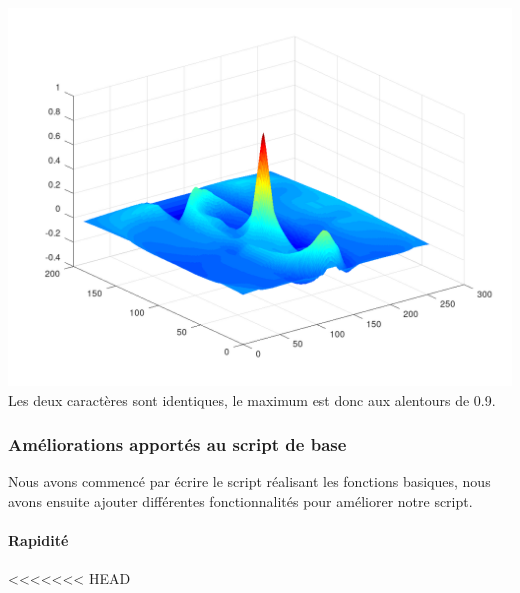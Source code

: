 \documentclass[a4paper,12pt,titlepage]{report}
\begin{document}
	\includegraphics[scale=0.25]{../illus/2corv.png}
	Les deux caractères sont identiques, le maximum est donc aux alentours de 0.9.
	
	\subsubsection{Améliorations apportés au script de base}
	Nous avons commencé par écrire le script réalisant les fonctions basiques, nous avons ensuite ajouter différentes fonctionnalités pour améliorer notre script.
	\paragraph{Rapidité}
<<<<<<< HEAD
\end{document}
